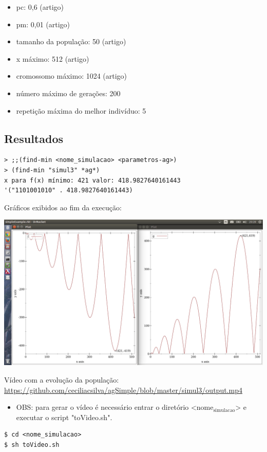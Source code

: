 \documentclass[11pt]{article}
\begin{document}
\begin{itemize}
\item pc: 0,6 (artigo)
\item pm: 0,01 (artigo)
\item tamanho da população: 50 (artigo)
\item x máximo: 512 (artigo)
\item cromossomo máximo: 1024 (artigo)
\item número máximo de gerações: 200
\item repetição máxima do melhor indivíduo: 5
\end{itemize}

\subsection{Resultados}
\label{sec-1-4}

\begin{verbatim}
> ;;(find-min <nome_simulacao> <parametros-ag>)
> (find-min "simul3" *ag*)
x para f(x) mínimo: 421 valor: 418.9827640161443
'("1101001010" . 418.9827640161443)
\end{verbatim}

Gráficos exibidos ao fim da execução:

\includegraphics[width=.9\linewidth]{imagens/ag-fgs3.png}

Vídeo com a evolução da população: \url{https://github.com/ceciliacsilva/agSimple/blob/master/simul3/output.mp4}

\begin{itemize}
\item OBS: para gerar o vídeo é necessário entrar o diretório <nome$_{\text{simulacao}}$> e executar o script "toVideo.sh".
\end{itemize}

\begin{verbatim}
$ cd <nome_simulacao>
$ sh toVideo.sh
\end{verbatim}
\end{document}
